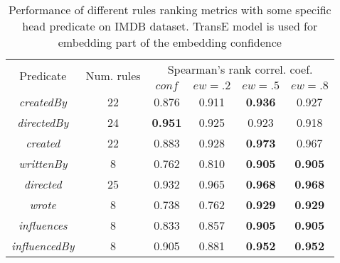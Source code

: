 \begin{table}[tbh]
\scriptsize
\centering
\begin{tabular}{|c|c|c|c|c|c|} 
 \hline
 \multirow{2}{*}{Predicate} & \multirow{2}{*}{Num. rules} & \multicolumn{4}{|c|}{Spearman's rank correl. coef.} \\
\cline{3-6}
 & & $conf$ & $ew=.2$ & $ew=.5$ & $ew=.8$ \\
 \hline
\textit{createdBy} & 22 & 0.876 & 0.911 & \textbf{0.936} & 0.927 \\
\textit{directedBy}  & 24 & \textbf{0.951} & 0.925 & 0.923 & 0.918\\
\textit{created} &  22 & 0.883 & 0.928 & \textbf{0.973} & 0.967\\
\textit{writtenBy} & 8 & 0.762 & 0.810 & \textbf{0.905} & \textbf{0.905}\\
\textit{directed} &  25 & 0.932 & 0.965 & \textbf{0.968} & \textbf{0.968}\\
\textit{wrote} & 8 & 0.738 & 0.762 & \textbf{0.929} & \textbf{0.929}\\
\textit{influences} & 8 & 0.833 & 0.857 & \textbf{0.905} & \textbf{0.905}\\
\textit{influencedBy} & 8 & 0.905 & 0.881 & \textbf{0.952} & \textbf{0.952}\\
 \hline
\end{tabular}
\newline
\caption{Performance of different rules ranking metrics with some specific head predicate on IMDB dataset. TransE model is used for embedding part of the embedding confidence}
\label{table:imdb_predicate_spearman}
\end{table}
